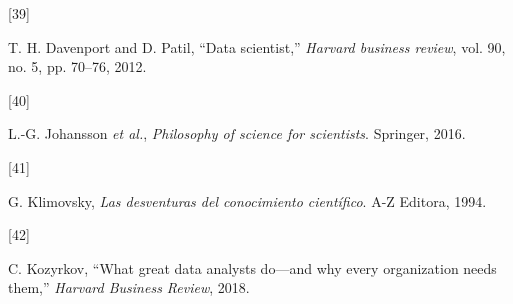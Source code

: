 \documentclass[
  12pt,
  letterpaper,
]{book}
\newlength{\cslhangindent}
\newlength{\csllabelwidth}
\newenvironment{CSLReferences}[2] %
 {\begin{list}{}{%
  \setlength{\itemindent}{0pt}
  \setlength{\leftmargin}{0pt}
  \setlength{\parsep}{0pt}
  \ifodd #1
   \setlength{\leftmargin}{\cslhangindent}
   \setlength{\itemindent}{-1\cslhangindent}
  \fi
  \setlength{\itemsep}{#2\baselineskip}}}
 {\end{list}}
\newcommand{\CSLLeftMargin}[1]{\parbox[t]{\csllabelwidth}{\strut#1\strut}}
\newcommand{\CSLRightInline}[1]{\parbox[t]{\linewidth - \csllabelwidth}{\strut#1\strut}}
\begin{document}
\begin{CSLReferences}{0}{0}
\CSLLeftMargin{{[}39{]} }%
\CSLRightInline{T. H. Davenport and D. Patil, {``Data scientist,''}
\emph{Harvard business review}, vol. 90, no. 5, pp. 70--76, 2012.}

\CSLLeftMargin{{[}40{]} }%
\CSLRightInline{L.-G. Johansson \emph{et al.}, \emph{Philosophy of
science for scientists}. Springer, 2016.}

\CSLLeftMargin{{[}41{]} }%
\CSLRightInline{G. Klimovsky, \emph{Las desventuras del conocimiento
científico}. A-Z Editora, 1994.}

\CSLLeftMargin{{[}42{]} }%
\CSLRightInline{C. Kozyrkov, {``What great data analysts do---and why
every organization needs them,''} \emph{Harvard Business Review}, 2018.}

\end{CSLReferences}


\backmatter
\end{document}
